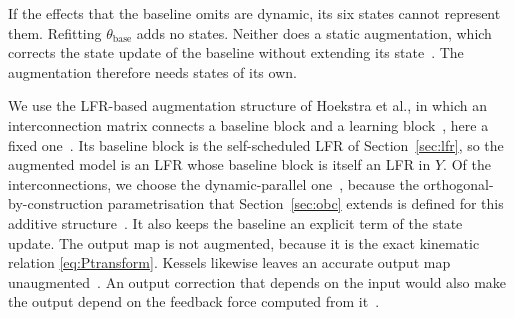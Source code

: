 If the effects that the baseline omits are dynamic, its six states cannot
represent them.
Refitting $\theta_{\mathrm{base}}$ adds no states.
Neither does a static augmentation, which corrects the state update of the
baseline without extending its state~\cite[Sec.~2]{hoekstra2025lfr}.
The augmentation therefore needs states of its own.

We use the LFR-based augmentation structure of Hoekstra et al., in which an
interconnection matrix connects a baseline block and a learning
block~\cite[Sec.~3.1]{hoekstra2025lfr}, here a fixed
one~\cite[Sec.~3.2]{hoekstra2025lfr}.
Its baseline block is the self-scheduled LFR of Section~\ref{sec:lfr}, so the
augmented model is an LFR whose baseline block is itself an LFR in $Y$.
Of the interconnections, we choose the dynamic-parallel
one~\cite[Table~1]{hoekstra2026lfr}, because the orthogonal-by-construction
parametrisation that Section~\ref{sec:obc} extends is defined for this
additive structure~\cite{gyorok2026obc}.
It also keeps the baseline an explicit term of the state update.
The output map is not augmented, because it is the exact kinematic relation
\eqref{eq:Ptransform}.
Kessels likewise leaves an accurate output map
unaugmented~\cite[Remark~5.3]{kessels2025ai}.
An output correction that depends on the input would also make the output
depend on the feedback force computed from it~\cite[Remark~5.1]{kessels2025ai}.


